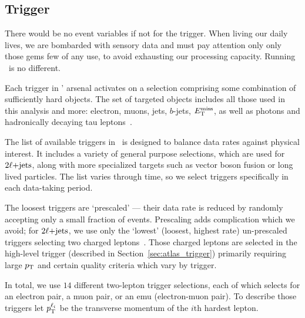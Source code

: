 \subsection{Trigger}
\label{sec:2ljets_trigger}
There would be no event variables if not for the trigger.
When living our daily lives, we are bombarded with sensory data and must pay
attention only only those gems few of any use, to avoid exhausting our
processing capacity.
Running \atlas\ is no different.

Each trigger in \atlas' arsenal activates on a selection comprising some
combination of sufficiently hard objects.
The set of targeted objects includes all those used in this analysis and more:
electron, muons, jets, $b$-jets, $E_\mathrm{T}^\mathrm{miss}$, as well as photons and hadronically
decaying tau leptons~\cite{atlas_PERF_2007_01}.

The list of available triggers in \atlas\ is designed to balance data rates
against physical interest.
It includes a variety of general purpose selections, which are used for
$2\ell\mathrm{+jets}$, along with more specialized targets such as vector boson fusion
or long lived particles.
The list varies through time, so we select triggers specifically in
each data-taking period.

The loosest triggers are `prescaled' --- their data rate is reduced by randomly
accepting only a small fraction of events.
Prescaling adds complication which we avoid;
for $2\ell\mathrm{+jets}$, we use only the `lowest' (loosest, highest rate) un-prescaled
triggers selecting two charged leptons~\cite{atlas_twiki_lowest_unprescaled}.
Those charged leptons are selected in the
high-level trigger (described in Section~\ref{sec:atlas_trigger})
primarily requiring large $p_\mathrm{T}$ and certain quality criteria which vary by
trigger.

In total, we use $14$ different two-lepton trigger selections, each of which
selects for an electron pair, a muon pair, or an emu (electron-muon pair).
To describe those triggers let $p_\mathrm{T}^{\ell_i}$ be the transverse momentum of the
$i\mathrm{th}$ hardest lepton.

